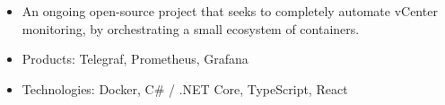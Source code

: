 \documentclass[10pt,a4paper]{altacv}
\begin{document}
\medskip




\begin{itemize}
  \item \small{An ongoing open-source project that seeks to completely automate vCenter monitoring, by orchestrating a small ecosystem of containers.}
  \item \small{Products: Telegraf, Prometheus, Grafana}
  \item \small{Technologies: Docker, C\# / .NET Core, TypeScript, React}
\end{itemize}
\end{document}
